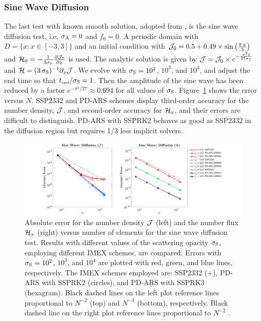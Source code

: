 \subsubsection{Sine Wave Diffusion}
The last test with known smooth solution, adopted from \cite{radice_etal_2013}, is the sine wave diffusion test, i.e. $\sigma_{{\rm A}} = 0$ and $f_0 = 0$.
A periodic domain with $D=\{x:x\in[-3,3]\}$ and an initial condition with $\mathcal{J}_{0} = 0.5+0.49\times\sin\big(\frac{\pi\,x}{3}\big)$ and $\mathcal{H}_{0} =-\frac{1}{3\sigma_{{\rm S}}}\frac{\partial \mathcal{J}_{0}}{\partial x}$ is used.
The analytic solution is given by $\mathcal{J} = \mathcal{J}_{0} \times e^{-\frac{\pi^2 t}{27\sigma_{{\rm S}}}}$ and $\mathcal{H} = (3\,\sigma_{{\rm S}})^{-1}\partial_{x}{\mathcal{J}}$.
We evolve with $\sigma_{{\rm S}}=10^{2}$, $10^{3}$, and $10^{4}$, and adjust the end time so that $t_{\mbox{\tiny end}}/\sigma_{{\rm S}}=1$. 
Then the amplitude of the sine wave has been reduced by a factor $e^{-\pi^{2}/27}\approx0.694$ for all values of $\sigma_{{\rm S}}$. 
Figure~\ref{fig:SineWaveDiffusionJ} shows the error versus $N$.
SSP2332 and PD-ARS schemes display third-order accuracy for the number density, $\mathcal{J}$, and second-order accuracy for $\mathcal{H}_{x}$, and their errors are difficult to distinguish.
PD-ARS with SSPRK2 behaves as good as SSP2332 in the diffusion region but requires 1/3 less implicit solvers.
\begin{figure}[h]
  \centering
  \centerline{\includegraphics[width=1.2\textwidth]{figures/SineWaveDiffusion}}
   \caption{Absolute error for the number density $\mathcal{J}$ (left) and the number flux $\mathcal{H}_{x}$ (right) versus number of elements for the sine wave diffusion test.  Results with different values of the scattering opacity $\sigma_{{\rm S}}$, employing different IMEX schemes, are compared.  Errors with $\sigma_{{\rm S}}=10^{2}$, $10^{3}$, and $10^{4}$ are plotted with red, green, and blue lines, respectively.  The IMEX schemes employed are:  SSP2332 ($+$), PD-ARS with SSPRK2 (circles), and PD-ARS with SSPRK3 (hexagram). Black dashed lines on the left plot reference lines proportional to $N^{-2}$ (top) and $N^{-3}$ (bottom), respectively. Black dashed line on the right plot reference lines proportional to $N^{-2}$ .}
   \label{fig:SineWaveDiffusionJ}
\end{figure}


